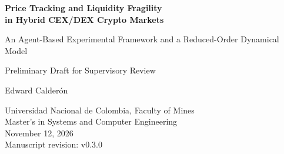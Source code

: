 \documentclass[10pt,a4paper]{article}
\newcommand{\revisionManuscrito}{v0.3.0}
\begin{document}
\begin{center}
  {\LARGE\bfseries Price Tracking and Liquidity Fragility\\
  in Hybrid CEX/DEX Crypto Markets\par}
  \vspace{0.35em}
  {\large An Agent-Based Experimental Framework and a Reduced-Order Dynamical Model\par}
  \vspace{0.35em}
  {\normalsize Preliminary Draft for Supervisory Review\par}
  \vspace{0.8em}
  {\large Edward Calderón\par}
  Universidad Nacional de Colombia, Faculty of Mines\\
  Master's in Systems and Computer Engineering\\
  November 12, 2026\\
  {\small Manuscript revision: \revisionManuscrito}
\end{center}







\appendix


\clearpage
\renewcommand{\refname}{References}


\end{document}
